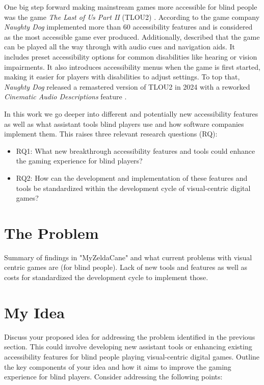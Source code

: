 \documentclass[sigconf,natbib=false,9pt]{acmart}
\begin{document}
	One big step forward making mainstream games more accessible for blind people was the game \emph{The Last of Us Part II} (TLOU2) \cite{playstation_last_nodate, playstation_last_nodate-1}. 
	According to \textcite{leite_extended_2021} the game company \emph{Naughty Dog} implemented more than 60 accessibility features and is considered as the most accessible game ever produced.
	Additionally, \textcite{dale_last_2024} described that the game can be played all the way through with audio cues and navigation aids.
	It includes preset accessibility options for common disabilities like hearing or vision impairments. 
	It also introduces accessibility menus when the game is first started, making it easier for players with disabilities to adjust settings.
	To top that, \emph{Naughty Dog} released a remastered version of TLOU2 in 2024 with a reworked \emph{Cinematic Audio Descriptions} feature \cite{playstation_last_nodate-2}.
	
	In this work we go deeper into different and potentially new accessibility features as well as what assistant tools blind players use and how software companies implement them.
	This raises three relevant research questions (RQ):
	
	\begin{itemize}
		\item RQ1: What new breakthrough accessibility features and tools could enhance the gaming experience for blind players?
		\item RQ2: How can the development and implementation of these features and tools be standardized within the development cycle of visual-centric digital games?
	\end{itemize}
	
	\section{The Problem}
	Summary of findings in "MyZeldaCane" and what current problems with visual centric games are (for blind people).
	Lack of new tools and features as well as costs for standardized the development cycle to implement those.
	
	\section{My Idea}
	Discuss your proposed idea for addressing the problem identified in the previous section. This could involve developing new assistant tools or enhancing existing accessibility features for blind people playing visual-centric digital games. Outline the key components of your idea and how it aims to improve the gaming experience for blind players. Consider addressing the following points:
	
\end{document}
